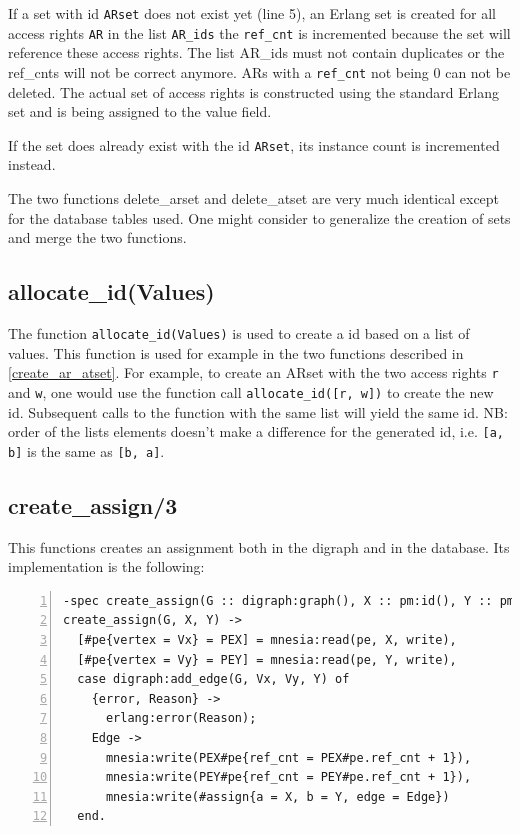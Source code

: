 \documentclass[12pt,a4paper,titlepage]{book}
\begin{document}
		If a set with id \lstinline|ARset| does not exist yet (line 5), an Erlang set is created for all access rights \lstinline|AR| in the list \lstinline|AR_ids| the \lstinline|ref_cnt| is incremented because the set will reference these access rights. The list AR\_ids must not contain duplicates or the ref\_cnts will not be correct anymore. ARs with a \lstinline|ref_cnt| not being 0 can not be deleted. The actual set of access rights is constructed using the standard Erlang set and is being assigned to the value field. 
		
		If the set does already exist with the id \lstinline|ARset|, its instance count is incremented instead.
		
		The two functions delete\_arset and delete\_atset are very much identical except for the database tables used. One might consider to generalize the creation of sets and merge the two functions.
		
	\subsection{allocate\_id(Values)}
	
		The function \lstinline|allocate_id(Values)| is used to create a id based on a list of values. This function is used for example in the two functions described in \ref{create_ar_atset}. For example, to create an ARset with the two access rights \lstinline|r| and \lstinline|w|, one would use the function call \lstinline|allocate_id([r, w])| to create the new id. Subsequent calls to the function with the same list will yield the same id. NB: order of the lists elements doesn't make a difference for the generated id, i.e. \lstinline|[a, b]| is the same as \lstinline|[b, a]|.
		
	\subsection{create\_assign/3}
	
		This functions creates an assignment both in the digraph and in the database. Its implementation is the following:
		
		\begin{lstlisting}[caption={create\_assign/3}, basicstyle=\footnotesize, breaklines=false, numbers=left]
-spec create_assign(G :: digraph:graph(), X :: pm:id(), Y :: pm:id()) -> ok | no_return().
create_assign(G, X, Y) ->
  [#pe{vertex = Vx} = PEX] = mnesia:read(pe, X, write),
  [#pe{vertex = Vy} = PEY] = mnesia:read(pe, Y, write),
  case digraph:add_edge(G, Vx, Vy, Y) of
    {error, Reason} ->
      erlang:error(Reason);
    Edge ->
      mnesia:write(PEX#pe{ref_cnt = PEX#pe.ref_cnt + 1}),
      mnesia:write(PEY#pe{ref_cnt = PEY#pe.ref_cnt + 1}),
      mnesia:write(#assign{a = X, b = Y, edge = Edge})
  end.\end{lstlisting}
  
\end{document}
